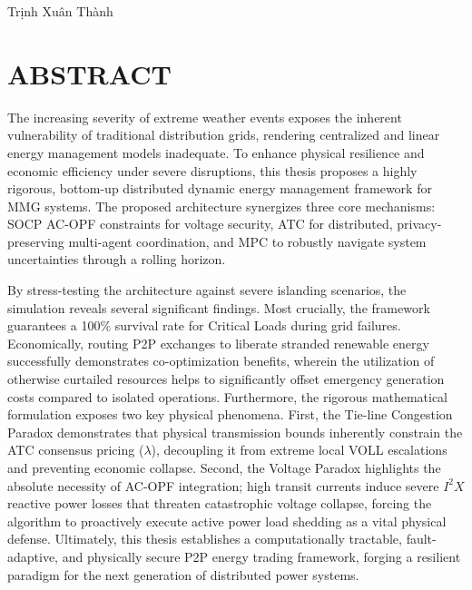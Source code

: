 \documentclass{thesis_1side}
\begin{document}
\vspace{0.5cm}
    \hspace{9.0cm} Trịnh Xuân Thành

\thispagestyle{empty}
    \clearpage

\section*{ABSTRACT}
    \thispagestyle{empty}

The increasing severity of extreme weather events exposes the inherent vulnerability of traditional distribution grids, rendering centralized and linear energy management models inadequate. To enhance physical resilience and economic efficiency under severe disruptions, this thesis proposes a highly rigorous, bottom-up distributed dynamic energy management framework for MMG systems. The proposed architecture synergizes three core mechanisms: SOCP AC-OPF constraints for voltage security, ATC for distributed, privacy-preserving multi-agent coordination, and MPC to robustly navigate system uncertainties through a rolling horizon. 

By stress-testing the architecture against severe islanding scenarios, the simulation reveals several significant findings. Most crucially, the framework guarantees a 100\% survival rate for Critical Loads during grid failures. Economically, routing P2P exchanges to liberate stranded renewable energy successfully demonstrates co-optimization benefits, wherein the utilization of otherwise curtailed resources helps to significantly offset emergency generation costs compared to isolated operations. Furthermore, the rigorous mathematical formulation exposes two key physical phenomena. First, the Tie-line Congestion Paradox demonstrates that physical transmission bounds inherently constrain the ATC consensus pricing ($\lambda$), decoupling it from extreme local VOLL escalations and preventing economic collapse. Second, the Voltage Paradox highlights the absolute necessity of AC-OPF integration; high transit currents induce severe $I^2X$ reactive power losses that threaten catastrophic voltage collapse, forcing the algorithm to proactively execute active power load shedding as a vital physical defense. Ultimately, this thesis establishes a computationally tractable, fault-adaptive, and physically secure P2P energy trading framework, forging a resilient paradigm for the next generation of distributed power systems.
\end{document}
